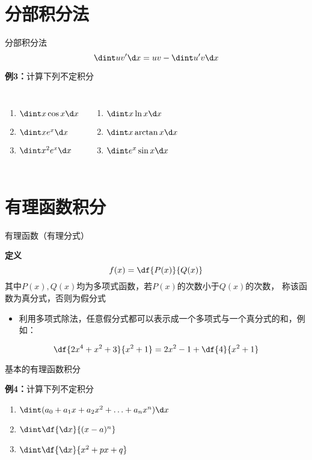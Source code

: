 \section{分部积分法}

\begin{frame}{分部积分法}
	\linespread{1.2}\pause 
	$$\dint uv'\d x=uv-\dint u'v\d x$$\pause 
	\begin{exampleblock}{{\bf 例3：}计算下列不定积分\hfill}
		\begin{columns}
				\begin{enumerate}\pause 
				  \item $\dint x\cos x\d x$\pause 
				  \item $\dint xe^x\d x$\pause 
				  \item $\dint x^2e^x\d x$\pause 
				\end{enumerate}
				\begin{enumerate}
				  \item $\dint x\ln x\d x$\pause 
				  \item $\dint x\arctan x\d x$\pause 
				  \item $\dint e^x\sin x\d x$
				\end{enumerate}
		\end{columns}
	\end{exampleblock}
\end{frame}

\section{有理函数积分}

\begin{frame}{有理函数（有理分式）}
	\linespread{1.2}\pause 
	\begin{block}{{\bf 定义}\hfill}
		$$f(x)=\df{P(x)}{Q(x)}$$
		其中$P(x),Q(x)$均为多项式函数\pause ，若$P(x)$的次数小于$Q(x)$的次数，
		称该函数为{\bb 真分式}\pause ，否则为{\bb 假分式}\pause 
	\end{block}
	\begin{itemize}
	  \item 利用{\bb 多项式除法}，任意假分式都可以表示成一个多项式与一个真分式的和，\pause 例如：
	\end{itemize}
	$$\df{2x^4+x^2+3}{x^2+1}=2x^2-1+\df{4}{x^2+1}$$
\end{frame}

\begin{frame}{基本的有理函数积分}
	\linespread{1.5}\pause 
	\begin{exampleblock}{{\bf 例4：}计算下列不定积分\hfill}
		\begin{enumerate}\pause 
		  \item $\dint (a_0+a_1x+a_2x^2+\ldots+a_nx^n)\d x$\pause 
		  \item $\dint\df{\d x}{(x-a)^n}$\pause 
		  \item $\dint\df{\d x}{x^2+px+q}$
		\end{enumerate}
	\end{exampleblock}
\end{frame}

